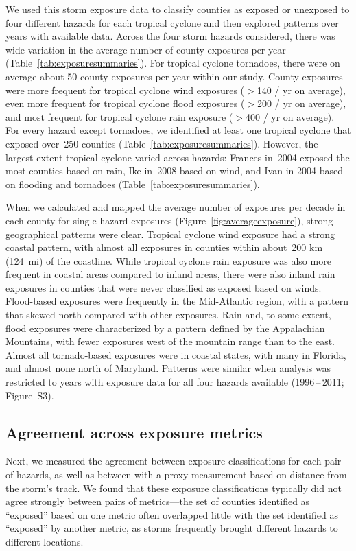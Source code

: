 We used this storm exposure data to classify counties as exposed or unexposed
to four different hazards for each tropical cyclone and then explored patterns
over years with available data. Across the four storm hazards considered, there
was wide variation in the average number of county exposures per year
(Table~\ref{tab:exposuresummaries}). For tropical cyclone tornadoes,
there were on average about 50 county exposures per year within our study.
County exposures were more frequent for tropical cyclone wind exposures ($>$140
/ yr on average), even more frequent for tropical cyclone flood exposures
($>$200 / yr on average), and most frequent for tropical cyclone rain exposure
($>$400 / yr on average). For every hazard except tornadoes, we identified at
least one tropical cyclone that exposed over~250 counties
(Table~\ref{tab:exposuresummaries}).  However, the largest-extent tropical
cyclone varied across hazards: Frances in~2004 exposed the most counties based
on rain, Ike in~2008 based on wind, and Ivan in 2004 based on flooding and
tornadoes (Table~\ref{tab:exposuresummaries}).

When we calculated and mapped the average number of exposures per decade in
each county for single-hazard exposures (Figure~\ref{fig:averageexposure}),
strong geographical patterns were clear. Tropical cyclone wind exposure had a
strong coastal pattern, with almost all exposures in counties within about~200
\si{\kilo\metre} (124~mi) of the coastline. While tropical cyclone rain
exposure was also more frequent in coastal areas compared to inland areas,
there were also inland rain exposures in counties that were never classified as
exposed based on winds. Flood-based exposures were frequently in the
Mid-Atlantic region, with a pattern that skewed north compared with other
exposures. Rain and, to some extent, flood exposures were characterized by a
pattern defined by the Appalachian Mountains, with fewer exposures west of the
mountain range than to the east. Almost all tornado-based exposures were in
coastal states, with many in Florida, and almost none north of Maryland.
Patterns were similar when analysis was restricted to years with exposure data
for all four hazards available (1996\,--\,2011; Figure~S3). 

\subsection*{Agreement across exposure metrics}

Next, we measured the agreement between exposure classifications for each pair
of hazards, as well as between with a proxy measurement based on
distance from the storm's track. We found that these exposure classifications
typically did not agree strongly between pairs of metrics---the set of counties
identified as ``exposed'' based on one metric often overlapped little with the set
identified as ``exposed'' by another metric, as storms frequently brought
different hazards to different locations. 

